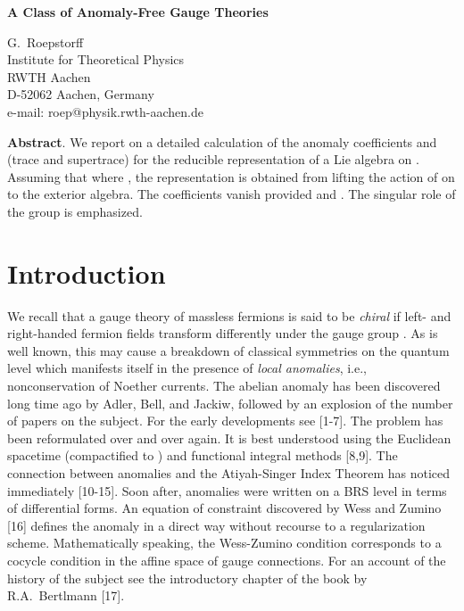 \documentclass[11pt,a4paper]{article}
\providecommand{\CC}{\mathbb{C}}
\providecommand{\bw}{{\textstyle\bigwedge}}
\providecommand{\ah}{\theta(a)}
\providecommand{\bh}{\theta(b)}
\providecommand{\ch}{\theta(c)}
\providecommand{\Tr}{\mbox{Tr}\,}
\providecommand{\Str}{\mbox{Str}\,}
\begin{document}
\begin{center}
\LARGE\bf A Class of Anomaly-Free Gauge Theories
\end{center}
\vspace{3mm}
\begin{center}\large 
       G.\ Roepstorff\\
       Institute for Theoretical Physics\\
       RWTH Aachen\\
       D-52062 Aachen, Germany\\
       e-mail: roep@physik.rwth-aachen.de
\end{center}
\vspace{5mm}\par\noindent
{\bf Abstract}.
We report on a detailed calculation of the anomaly coefficients 
\myHighlight{$\Tr(\ah\{\bh,\ch\})$}\coordHE{} and \myHighlight{$\Str(\ah\{\bh,\ch\})$}\coordHE{} (trace and supertrace) for 
the reducible representation \myHighlight{$\theta$}\coordHE{} of a Lie algebra \coordHE{} on 
\myHighlight{$\bw\CC^n$}\coordHE{}. Assuming that \coordHE{} where \coordHE{}, the representation \myHighlight{$\theta$}\coordHE{} is 
obtained from lifting the action of \coordHE{} on \myHighlight{$\CC^n$}\coordHE{} to the exterior algebra. 
The coefficients vanish provided \coordHE{} and \coordHE{}. The singular
role of the group \coordHE{} is emphasized.

\section{Introduction}

We recall that a gauge theory of massless fermions is said to be 
{\em chiral\/} if left- and
right-handed fermion fields transform differently under the gauge group \coordHE{}.
As is well known, this may cause a breakdown of classical symmetries on
the quantum level which manifests itself in the presence of {\em local
anomalies}, i.e., nonconservation of Noether currents. The abelian anomaly
has been discovered long time ago by Adler, Bell, and Jackiw, followed by
an explosion of the number of papers on the subject. For the early developments
see [1-7]. The problem has been reformulated over and over again. 
It is best understood using the Euclidean spacetime (compactified to \coordHE{})
and functional integral methods [8,9]. The connection between anomalies and 
the Atiyah-Singer Index Theorem has noticed immediately [10-15]. Soon after,
anomalies were written on a BRS level in terms of differential forms.
An equation of constraint discovered by Wess and Zumino [16] defines
the anomaly in a direct way without recourse to a regularization scheme.
Mathematically speaking, the Wess-Zumino condition corresponds to a
cocycle condition in the affine space of gauge connections. For an account
of the history of the subject see the introductory chapter of the book
by R.A.\ Bertlmann [17].
\end{document}

